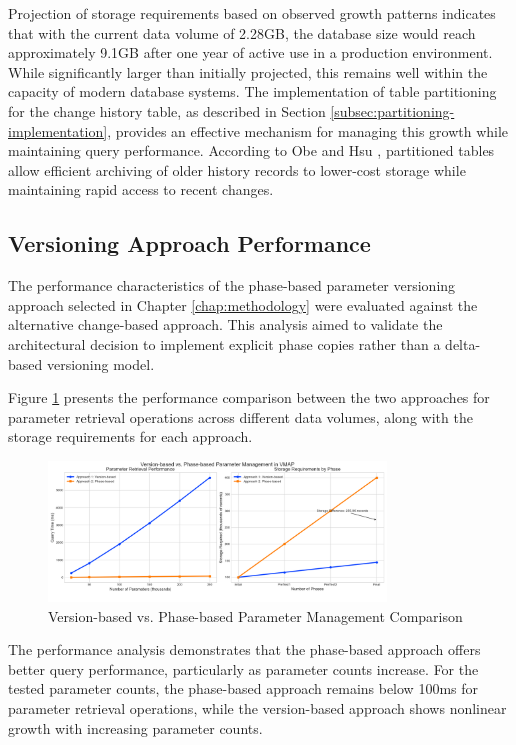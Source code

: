 Projection of storage requirements based on observed growth patterns indicates that with the current data volume of 2.28GB, the database size would reach approximately 9.1GB after one year of active use in a production environment. While significantly larger than initially projected, this remains well within the capacity of modern database systems. The implementation of table partitioning for the change history table, as described in Section \ref{subsec:partitioning-implementation}, provides an effective mechanism for managing this growth while maintaining query performance. According to Obe and Hsu \cite{obe2017postgresql}, partitioned tables allow efficient archiving of older history records to lower-cost storage while maintaining rapid access to recent changes.

\subsection{Versioning Approach Performance}
\label{subsec:versioning-approach-performance}

The performance characteristics of the phase-based parameter versioning approach selected in Chapter \ref{chap:methodology} were evaluated against the alternative change-based approach. This analysis aimed to validate the architectural decision to implement explicit phase copies rather than a delta-based versioning model.

Figure \ref{fig:versioning-approach-comparison} presents the performance comparison between the two approaches for parameter retrieval operations across different data volumes, along with the storage requirements for each approach.

\begin{figure}[h]
    \centering
    \includegraphics[width=0.8\textwidth]{figures/vmap_versioning_approaches_simplified.png}
    \caption{Version-based vs. Phase-based Parameter Management Comparison}
    \label{fig:versioning-approach-comparison}
\end{figure}

The performance analysis demonstrates that the phase-based approach offers better query performance, particularly as parameter counts increase. For the tested parameter counts, the phase-based approach remains below 100ms for parameter retrieval operations, while the version-based approach shows nonlinear growth with increasing parameter counts.

